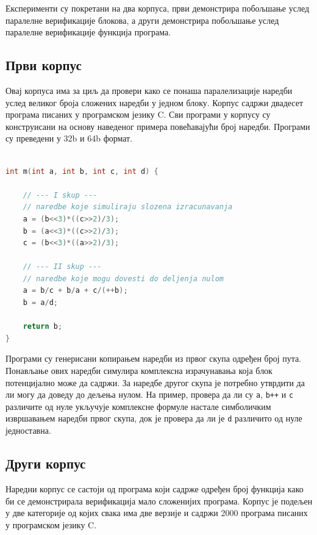 \documentclass[12pt,oneside]{memoir}
\begin{document}
  Експерименти су покретани на два корпуса, први демонстрира побољшање услед паралелне верификације блокова, а други демонстрира побољшање услед паралелне верификације функција програма.
  \subsection{Први корпус}
  
 Овај корпуса има за циљ да провери како се понаша паралелизације наредби услед великог броја сложених наредби у једном блоку. Корпус садржи двадесет програма писаних у програмском језику C. Сви програми у корпусу су конструисани на основу наведеног примера повећавајући број наредби. Програми су преведени у 32b и 64b формат. \newpage

  
\begin{lstlisting}[language=C,frame=single,caption=Пример програма,label=primer1]

int m(int a, int b, int c, int d) {

	// --- I skup ---
	// naredbe koje simuliraju slozena izracunavanja
	a = (b<<3)*((c>>2)/3);
	b = (a<<3)*((c>>2)/3);
	c = (b<<3)*((a>>2)/3);

	// --- II skup --- 
	// naredbe koje mogu dovesti do deljenja nulom
	a = b/c + b/a + c/(++b);
	b = a/d;
	
	return b;
}
\end{lstlisting}
 Програми су генерисани копирањем наредби из првог скупа одређен број пута. Понављање ових наредби симулира комплексна израчунавања која блок потенцијално може да садржи. За наредбе другог скупа је потребно утврдити да ли могу да доведу до дељења нулом. На пример, провера да ли су \texttt{a}, \texttt{b++} и \texttt{c} различите од нуле укључује комплексне формуле настале симболичким извршавањем наредби првог скупа, док је провера да ли је \texttt{d} различито од нуле једноставна.    


\subsection{Други корпус}

Наредни корпус се састоји од програма који садрже одређен број функција како би се демонстрирала верификација мало сложенијих програма. Корпус је подељен у две категорије од којих свака има две верзије и садржи 2000 програма писаних у програмском језику C. 
\end{document}
